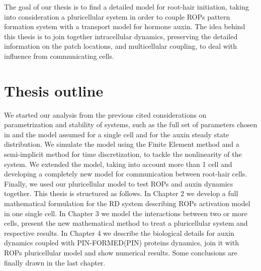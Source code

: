 The goal of our thesis is to find a detailed model for root-hair initiation, taking into consideration a pluricellular system in order to couple ROPs pattern formation system with a transport model for hormone auxin. The idea behind this thesis is to join together intracellular dynamics, preserving the detailed information on the patch locations, and multicellular coupling, to deal with influence from communicating cells.

\section{Thesis outline}
We started our analysis from the previous cited considerations on parametrization and stability of systems, such as the full set of parameters chosen in \cite{phdthesis:victor} and the model assumed for a single cell and for the auxin steady state distribution. We simulate the model using the Finite Element method and a semi-implicit method for time discretization, to tackle the nonlinearity of the system. We extended the model, taking into account more than 1 cell and developing a completely new model for communication between root-hair cells. Finally, we used our pluricellular model to test ROPs and auxin dynamics together.
This thesis is structured as follows. In Chapter 2 we develop a full mathematical formulation for the RD system describing ROPs activation model in one single cell. In Chapter 3 we model the interactions between two or more cells, present the new mathematical method to treat a pluricellular system and respective results. In Chapter 4 we describe the biological details for auxin dynamics coupled with PIN-FORMED(PIN) proteins dynamics, join it with ROPs pluricellular model and show numerical results. Some conclusions are finally drawn in the last chapter.

